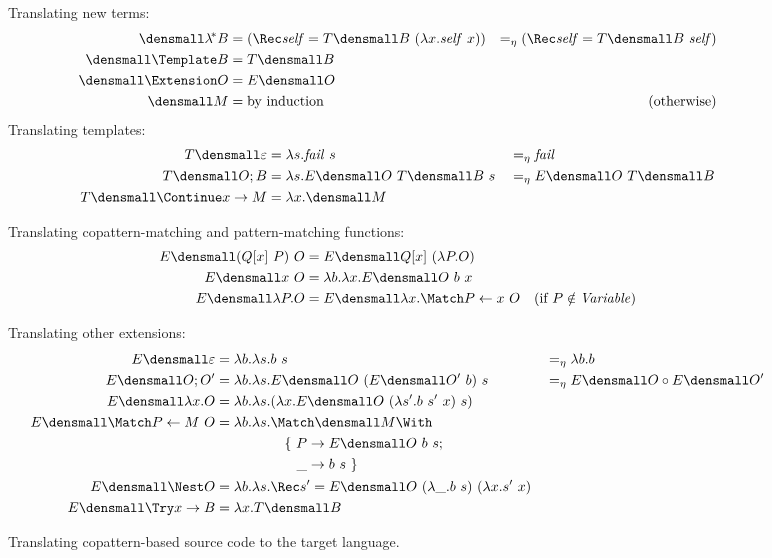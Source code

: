\begin{figure}
\centering
Translating new terms:  
\begin{align*}
  \den{\lamstar B}
  &=
  (\Rec \mathit{self} = T\den{B} ~ (\lambda x. \mathit{self} ~ x))
  &=_\eta
  (\Rec \mathit{self} = T\den{B} ~ \mathit{self})
  \\
  \den{\Template B}
  &=
  T\den{B}
  \\
  \den{\Extension O}
  &=
  E\den{O}
  \\
  \den{M}
  &=
  \text{by induction}
  &(\text{otherwise})
\end{align*}
Translating templates:
\begin{align*}
  T\den{\varepsilon}
  &=
  \lambda s. \mathit{fail}~s
  &
  &=_\eta
  \mathit{fail}
  \\
  T\den{O; B}
  &=
  \lambda s. E\den{O} ~ T\den{B} ~ s
  &
  &=_\eta
  E\den{O} ~ T\den{B}
  \\
  T\den{\Continue x \to M}
  &=
  \lambda x. \den{M}
\end{align*}

Translating copattern-matching and pattern-matching functions:
\begin{align*}
  E\den{(Q[x] ~ P) ~ O}
  &=
  E\den{Q[x] ~ (\lambda P. O)}
  \\
  E\den{x ~ O}
  &=
  \lambda b. \lambda x. E\den{O} ~ b ~ x
  \\
  E\den{\lambda P. O}
  &=
  E\den{\lambda x. \Match P \gets x ~ O}
  &(\text{if } P \notin \mathit{Variable})
\end{align*}

Translating other extensions:
\begin{align*}
  E\den{\varepsilon}
  &=
  \lambda b. \lambda s. b ~ s
  &
  &=_\eta
  \lambda b. b
  \\
  E\den{O; O'}
  &=
  \lambda b. \lambda s. E\den{O} ~ (E\den{O'}~b) ~ s
  &
  &=_\eta
  E\den{O} \comp E\den{O'}
  \\
  E\den{\lambda x. O}
  &=
  \lambda b. \lambda s. (\lambda x. E\den{O} ~ (\lambda s'. b ~ s' ~ x) ~ s)
  \\
  E\den{\Match P \gets M ~ O}
  &=
  \lambda b. \lambda s.
  \begin{aligned}[t]
    &\Match \den{M} \With \\
    &\quad
    \begin{aligned}[t]
      \{~
      P &\to E\den{O}~b~s; \\
      \_ &\to b~s
      ~\}
    \end{aligned}
  \end{aligned}
  \\
  E\den{\Nest O}
  &=
  \lambda b. \lambda s. \Rec s' = E\den{O} ~ (\lambda \_. b ~ s) ~ (\lambda x. s' ~ x)
  \\
  E\den{\Try x \to B}
  &=
  \lambda x. T\den{B}
\end{align*}
\caption{Translating copattern-based source code to the target language.}
\label{fig:translation}
\end{figure}

